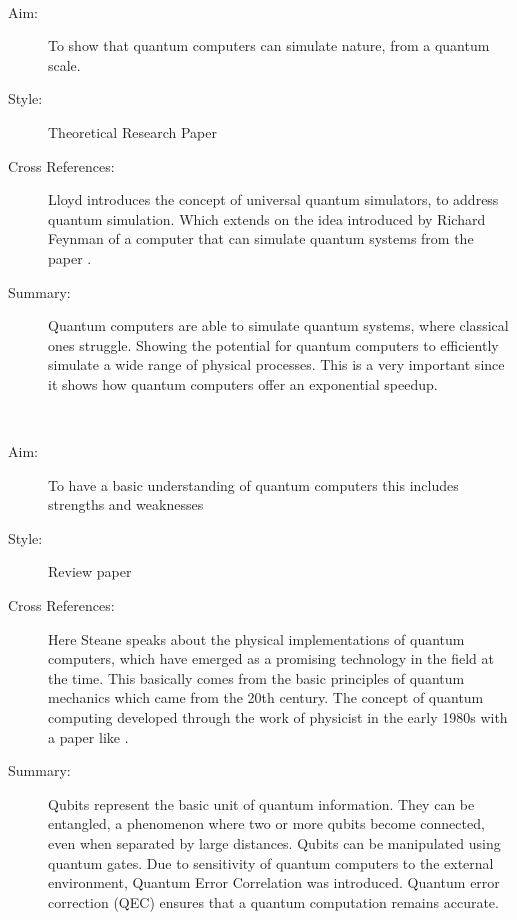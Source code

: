 \documentclass{Assignment}
\begin{document}
\newpage
\cite{UQS}~

\begin{description}
	\item[Aim:] To show that quantum computers can simulate nature, from a quantum scale.
	
	\item [Style:] Theoretical Research Paper
	
	\item [Cross References:] Lloyd introduces the concept of universal quantum simulators, to address quantum simulation. 
	Which extends on the idea introduced by Richard Feynman of a computer that can simulate quantum systems from the paper \cite{feynman1982simulating}. 
	
	\item[Summary:] Quantum computers are able to simulate quantum systems, where classical ones struggle. 
	Showing the potential for quantum computers to efficiently simulate a wide range of physical processes.	
	This is a very important since it shows how quantum computers offer an exponential speedup.
	
	
\end{description}
\newpage
\cite{AndrewSteane}~
\begin{description}
	\item[Aim:] To have a basic understanding of quantum computers this includes strengths and weaknesses
	
	\item [Style:] Review paper
	
	\item [Cross References:] Here Steane speaks about the physical implementations of quantum computers, which have emerged as a promising technology in the field at the time. 
	This basically comes from  the basic principles of quantum mechanics which came from the 20th century.
	The concept of quantum computing developed through the work of physicist in the early 1980s with a paper like \cite{feynman1982simulating}. 
	
	
	\item[Summary:]
	Qubits represent the basic unit of quantum information.
	They can be entangled, a phenomenon where two or more qubits become connected, even when separated by large distances.
	Qubits can be manipulated using quantum gates.
	Due to sensitivity of quantum computers to the external environment, Quantum Error Correlation was introduced.
	Quantum error correction (QEC) ensures that a quantum computation remains  accurate.
\end{description}
	 	\newpage
	 	
\end{document}
